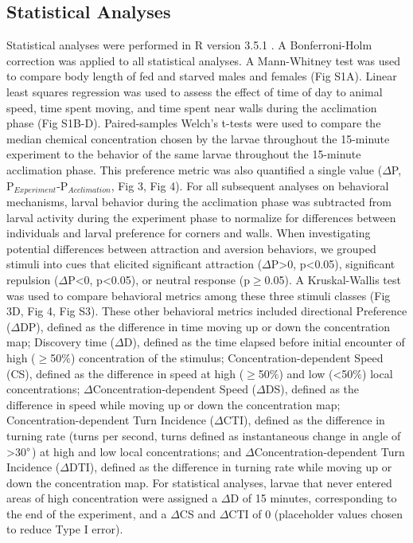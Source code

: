 \subsection*{Statistical Analyses} 
\noindent Statistical analyses were performed in R version 3.5.1 \cite{noauthor_undated-ge}. A Bonferroni-Holm correction was applied to all statistical analyses. A Mann-Whitney test was used to compare body length of fed and starved males and females (Fig S1A). Linear least squares regression was used to assess the effect of time of day to animal speed, time spent moving, and time spent near walls during the acclimation phase (Fig S1B-D). Paired-samples Welch's t-tests were used to compare the median chemical concentration chosen by the larvae throughout the 15-minute experiment to the behavior of the same larvae throughout the 15-minute acclimation phase. This preference metric was also quantified a single value (${\Delta}$P, P${_{Experiment}}$-P${_{Acclimation}}$, Fig 3, Fig 4). For all subsequent analyses on behavioral mechanisms, larval behavior during the acclimation phase was subtracted from larval activity during the experiment phase to normalize for differences between individuals and larval preference for corners and walls. When investigating potential differences between attraction and aversion behaviors, we grouped stimuli into cues that elicited significant attraction (${\Delta}$P>0, p<0.05), significant repulsion (${\Delta}$P<0, p<0.05), or neutral response (p${\geq}$0.05). A Kruskal-Wallis test was used to compare behavioral metrics among these three stimuli classes (Fig 3D, Fig 4, Fig S3). These other behavioral metrics included directional Preference (${\Delta}$DP), defined as the difference in time moving up or down the concentration map; Discovery time (${\Delta}$D), defined as the time elapsed before initial encounter of high (${\geq}$50${\%}$) concentration of the stimulus; Concentration-dependent Speed (CS), defined as the difference in speed at high (${\geq}$50${\%}$) and low (<50${\%}$) local concentrations; ${\Delta}$Concentration-dependent Speed (${\Delta}$DS), defined as the difference in speed while moving up or down the concentration map; Concentration-dependent Turn Incidence (${\Delta}$CTI), defined as the difference in turning rate (turns per second, turns defined as instantaneous change in angle of >30${\degree}$) at high and low local concentrations; and ${\Delta}$Concentration-dependent Turn Incidence (${\Delta}$DTI), defined as the difference in turning rate while moving up or down the concentration map. For statistical analyses, larvae that never entered areas of high concentration were assigned a ${\Delta}$D of 15 minutes, corresponding to the end of the experiment, and a ${\Delta}$CS and ${\Delta}$CTI of 0 (placeholder values chosen to reduce Type I error). 

